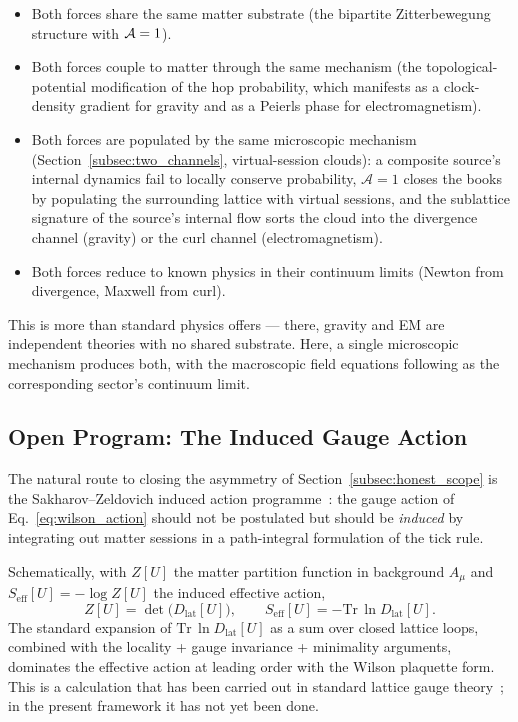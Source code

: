 \begin{itemize}
    \item Both forces share the same matter substrate (the bipartite
    Zitterbewegung structure with $\mathcal{A}=1$).
    \item Both forces couple to matter through the same mechanism
    (the topological-potential modification of the hop probability,
    which manifests as a clock-density gradient for gravity and as a
    Peierls phase for electromagnetism).
    \item Both forces are populated by the same microscopic mechanism
    (Section~\ref{subsec:two_channels}, virtual-session clouds): a
    composite source's internal dynamics fail to locally conserve
    probability, $\mathcal{A}=1$ closes the books by populating the
    surrounding lattice with virtual sessions, and the sublattice
    signature of the source's internal flow sorts the cloud into the
    divergence channel (gravity) or the curl channel
    (electromagnetism).
    \item Both forces reduce to known physics in their continuum
    limits (Newton from divergence, Maxwell from curl).
\end{itemize}

This is more than standard physics offers --- there, gravity and EM
are independent theories with no shared substrate.  Here, a single
microscopic mechanism produces both, with the macroscopic field
equations following as the corresponding sector's continuum limit.

\subsection{Open Program: The Induced Gauge Action}
\label{subsec:open_program}

The natural route to closing the asymmetry of
Section~\ref{subsec:honest_scope} is the Sakharov--Zeldovich induced
action programme~\cite{sakharov1967}: the gauge action of
Eq.~\eqref{eq:wilson_action} should not be postulated but should be
\emph{induced} by integrating out matter sessions in a path-integral
formulation of the tick rule.

Schematically, with $Z[U]$ the matter partition function in
background $A_\mu$ and $S_\text{eff}[U] = -\log Z[U]$ the induced
effective action,
\begin{equation}
    Z[U] = \det\bigl(D_\text{lat}[U]\bigr),
    \qquad
    S_\text{eff}[U] = -\mathrm{Tr}\,\ln D_\text{lat}[U].
    \label{eq:induced_action}
\end{equation}
The standard expansion of $\mathrm{Tr}\,\ln D_\text{lat}[U]$ as a sum
over closed lattice loops, combined with the locality + gauge
invariance + minimality arguments, dominates the effective action at
leading order with the Wilson plaquette form. This is a calculation
that has been carried out in standard lattice gauge
theory~\cite{kogutsusskind1975}; in the present framework it has
not yet been done.

